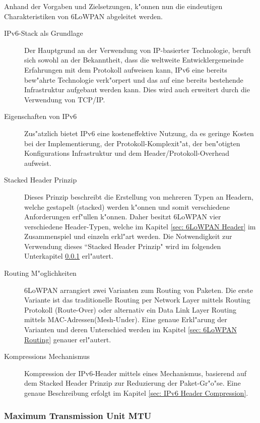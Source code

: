 \documentclass[final]{lktseminar}
\begin{document}
Anhand der Vorgaben und Zielsetzungen, k"onnen nun die eindeutigen Charakteristiken von 6LoWPAN abgeleitet werden.
\begin{description}
    \item[IPv6-Stack als Grundlage] Der Hauptgrund an der Verwendung von IP-basierter
    Technologie, beruft sich sowohl an der Bekanntheit, dass die weltweite Entwicklergemeinde
    Erfahrungen mit dem Protokoll aufweisen kann, IPv6 eine bereits bew"ahrte Technologie verk"orpert
    und das auf eine bereits bestehende Infrastruktur aufgebaut werden kann. Dies wird auch
    erweitert durch die Verwendung von TCP/IP.

    \item[Eigenschaften von IPv6] Zus"atzlich bietet IPv6 eine kosteneffektive Nutzung, da es geringe
    Kosten bei der Implementierung, der Protokoll-Komplexit"at, der ben"otigten Konfigurations Infrastruktur
    und dem Header/Protokoll-Overhead aufweist.

    \item[Stacked Header Prinzip] Dieses Prinzip beschreibt die Erstellung von mehreren Typen an Headern,
    welche gestapelt (stacked) werden k"onnen und somit verschiedene Anforderungen erf"ullen k"onnen. Daher
    besitzt 6LoWPAN vier verschiedene Header-Typen, welche im Kapitel \ref{sec: 6LoWPAN Header} im Zusammenspiel und
    einzeln erkl"art werden. Die Notwendigkeit zur Verwendung dieses ``Stacked Header Prinzip" wird im folgenden Unterkapitel
    \ref{sec: Maximum Transmission Unit MTU} erl"autert.

    \item[Routing M"oglichkeiten] 6LoWPAN arrangiert zwei Varianten zum Routing von Paketen.
    Die erste Variante ist das traditionelle Routing per Network Layer mittels Routing Protokoll (Route-Over)
    oder alternativ ein Data Link Layer Routing mittels MAC-Adressen(Mesh-Under). Eine genaue Erkl"arung der
    Varianten und deren Unterschied werden im Kapitel \ref{sec: 6LoWPAN Routing} genauer erl"autert.

    \item[Kompressions Mechanismus] Kompression der IPv6-Header mittels eines Mechanismus, basierend
    auf dem Stacked Header Prinzip zur Reduzierung der Paket-Gr"o"se. Eine genaue Beschreibung erfolgt
    im Kapitel \ref{sec: IPv6 Header Compression}.

\end{description}

\subsubsection{Maximum Transmission Unit MTU}
\label{sec: Maximum Transmission Unit MTU}
\end{document}
